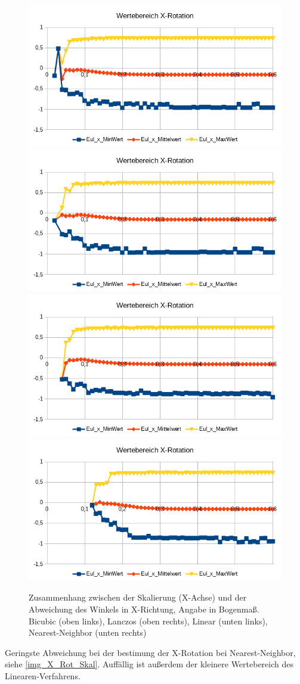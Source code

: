 \begin{figure}
	\centering
	\includegraphics[width=0.45\linewidth]{tabelle2/X_Rot_Val_Cubic}
	\includegraphics[width=0.45\linewidth]{tabelle2/X_Rot_Val_Lanc}
	\includegraphics[width=0.45\linewidth]{tabelle2/X_Rot_Val_Linear}
	\includegraphics[width=0.45\linewidth]{tabelle2/X_Rot_Val_NN}
	\caption{Zusammenhang zwischen der Skalierung (X-Achse) und der Abweichung des Winkels in X-Richtung, Angabe in Bogenmaß. 
		Bicubic (oben links), Lanczos (oben rechts), Linear (unten links), Nearest-Neighbor (unten rechts)}
	\label{img_X_Rot_Val_Skal}
\end{figure}
Geringste Abweichung bei der bestimung der X-Rotation bei Nearest-Neighbor, siehe \autoref{img_X_Rot_Skal}. Auffällig ist außerdem der kleinere Wertebereich des Linearen-Verfahrens.\\
